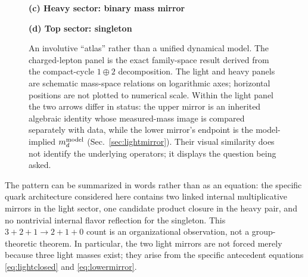 \documentclass[aps,twocolumn,superscriptaddress,nofootinbib,floatfix]{revtex4-2}
\newcommand{\mstar}{\mu_\star}
\newcommand{\alphaK}{\alpha_K}
\begin{document}
\begin{figure}[t]
\begin{minipage}[t]{0.48\textwidth}
\centering
\textbf{(c) Heavy sector: binary mass mirror}\\[2pt]
\end{minipage}\hfill
\begin{minipage}[t]{0.48\textwidth}
\centering
\textbf{(d) Top sector: singleton}\\[2pt]
\end{minipage}
\caption{An involutive ``atlas'' rather than a unified dynamical model. The charged-lepton panel is the exact family-space result derived from the compact-cycle $1\oplus2$ decomposition. The light and heavy panels are schematic mass-space relations on logarithmic axes; horizontal positions are not plotted to numerical scale. Within the light panel the two arrows differ in status: the upper mirror is an inherited algebraic identity whose measured-mass image is compared separately with data, while the lower mirror's endpoint is the model-implied $m_d^{\rm model}$ (Sec.~\ref{sec:lightmirror}). Their visual similarity does not identify the underlying operators; it displays the question being asked.}
\label{fig:atlas}
\end{figure}

The pattern can be summarized in words rather than as an equation: the specific quark architecture considered here contains two linked internal multiplicative mirrors in the light sector, one candidate product closure in the heavy pair, and no nontrivial internal flavor reflection for the singleton. This $3+2+1\to2+1+0$ count is an organizational observation, not a group-theoretic theorem. In particular, the two light mirrors are not forced merely because three light masses exist; they arise from the specific antecedent equations \eqref{eq:lightclosed} and \eqref{eq:lowermirror}.
\end{document}
